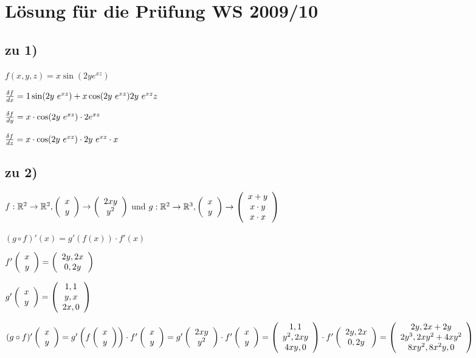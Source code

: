 \renewcommand{\ldate}{2016-01-14}
% 

\section{Lösung für die Prüfung WS 2009/10}

\subsection{zu 1)}
$ f(x,y,z) = x \sin(2y e^{xz}) $ 

$ \frac{\df}{dx} = 1 \sin(2y\ e^{xz}) + x \cos(2y\ e^{xz}) 2y\ e^{xz} z $

$ \frac{\df}{dy} = x\cdot \cos(2y\ e^{xz}) \cdot 2e^{xz} $

$ \frac{\df}{dz} = x \cdot \cos(2y\ e^{xz}) \cdot 2y\ e^{xz} \cdot x $

\subsection{zu 2)}
$ f: \R^2 \rightarrow \R^2, \vektor{x\\y} \rightarrow \vektor{2xy\\y^2} $ und $ g: \R^2 \rightarrow \R^3, \vektor{x\\y} \rightarrow \vektor{x+y\\x\cdot y\\x\cdot x} $

$ (g\circ f)'(x) = g'(f(x)) \cdot f'(x) $

$ f'\vektor{x\\y} = \vektor{2y, 2x\\0, 2y} $

$ g'\vektor{x\\y} = \vektor{1, 1\\y, x\\2x, 0} $

$ (g\circ f)'\vektor{x\\y} = g' \rbr{f\vektor{x\\y}} \cdot f'\vektor{x\\y} 
= g'\vektor{2xy\\y^2} \cdot f'\vektor{x\\y}
= \vektor{1, 1\\y^2, 2xy\\4xy, 0} \cdot f'\vektor{2y, 2x\\0, 2y}
= \vektor{2y, 2x + 2y\\2y^3, 2xy^2 + 4xy^2\\8xy^2, 8x^2y, 0}
$

